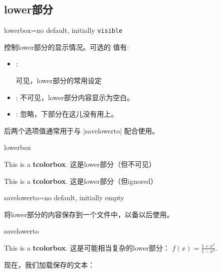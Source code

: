   

\subsection{lower部分}
\begin{docTcbKey}{lowerbox}{=}{no default, initially \texttt{visible}}

控制lower部分的显示情况。可选的  值有:
\begin{itemize}
\item{}: %

可见，lower部分的常用设定

\item{}: %
不可见，lower部分内容显示为空白。

\item{}: %
忽略，下部分在这儿没有用上。
\end{itemize}

后两个选项值通常用于与 |savelowerto| 配合使用。

\begin{exdispExample}{lowerbox}
\begin{tcolorbox}[lowerbox=invisible,colback=white]
This is a \textbf{tcolorbox}.
\tcblower
这是lower部分（但不可见）
\end{tcolorbox}

\begin{tcolorbox}[lowerbox=ignored,colback=white]
This is a \textbf{tcolorbox}.
\tcblower
这是lower部分（但ignored）
\end{tcolorbox}
\end{exdispExample}
\end{docTcbKey}


\begin{docTcbKey}[][doc updated=2014-11-28]{savelowerto}{=}{no default, initially empty}

将lower部分的内容保存到一个文件中，以备以后使用。
\begin{exdispExample}{savelowerto}
\begin{tcolorbox}[lowerbox=invisible,savelowerto=\jobname_bspsave.tex,colback=white]
This is a \textbf{tcolorbox}.
\tcblower
这是可能相当复杂的lower部分：
$\displaystyle f(x)=\frac{1+x^2}{1-x^2}$.
\end{tcolorbox}

现在，我们加载保存的文本：\\

\end{exdispExample}
\end{docTcbKey}



